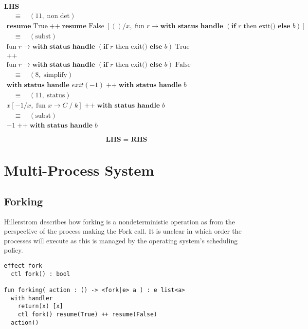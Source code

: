 \documentclass[logo,bsc,singlespacing,parskip]{infthesis}
\begin{document}
\textbf{LHS}
\[
\begin{array}{l}
\quad\equiv\quad (11,\; \text{non det}) \\[5pt]
\textbf{resume } \text{True} \;\texttt{++}\; \textbf{resume } \text{False} \; [()/x,\; \text{fun } r \rightarrow \textbf{with status handle } (\textbf{if } r \text{ then exit()} \textbf{ else } b)] \\[5pt]

\quad\equiv\quad (\text{subst}) \\[5pt]
\text{fun } r \rightarrow \textbf{with status handle } (\textbf{if } r \text{ then exit()} \textbf{ else } b)\; \text{True} \\
\texttt{++} \\
\text{fun } r \rightarrow \textbf{with status handle } (\textbf{if } r \text{ then} \text{ exit()} \textbf{ else } b)\; \text{False} \\[5pt]

\quad\equiv\quad (8,\; \text{simplify}) \\[5pt]
\textbf{with status handle } exit(-1) \;\texttt{++}\; \textbf{with status handle } b \\[5pt]

\quad\equiv\quad (11,\; \text{status}) \\[5pt]
x [-1/x,\; \text{fun } x \rightarrow C \;/\; k] \;\texttt{++}\; \textbf{with status handle } b \\[5pt]

\quad\equiv\quad (\text{subst}) \\[5pt]
-1 \;\texttt{++}\; \textbf{with status handle } b
\end{array}
\]


\[
\textbf{LHS = RHS}
\]


\section{Multi-Process System}
\subsection*{Forking}
Hillerstrom describes how forking is a nondeterministic operation as from the perspective of the process making the Fork call. It is unclear in which order the processes will execute as this is managed by the operating system's scheduling policy. 

\begin{lstlisting}
effect fork
  ctl fork() : bool     

fun forking( action : () -> <fork|e> a ) : e list<a>
  with handler
    return(x) [x]
    ctl fork() resume(True) ++ resume(False)
  action()
\end{lstlisting}
\end{document}
